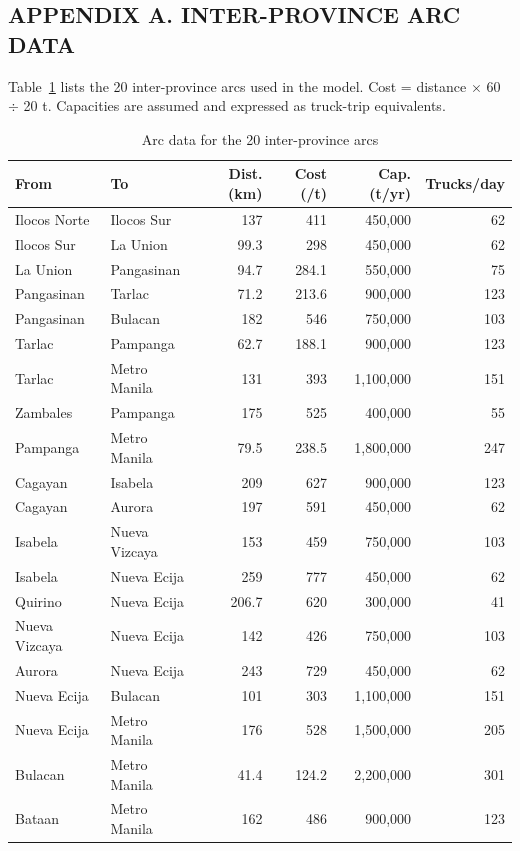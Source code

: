 \documentclass{icsthesis}
\begin{document}
\begin{mainmatter}

\doublespacing
\section{APPENDIX A. INTER-PROVINCE ARC DATA}
Table~\ref{tab:appA} lists the 20 inter-province arcs used in the model. Cost = distance $\times$ 60 $\div$ 20 t. Capacities are assumed and expressed as truck-trip equivalents.

\begin{table}[htbp]
\caption{Arc data for the 20 inter-province arcs}
\label{tab:appA}
\centering
\small
\setlength{\tabcolsep}{1.5pt}
\begin{tabular}{llrrrr}
\hline
From & To & Dist. (km) & Cost (/t) & Cap. (t/yr) & Trucks/day \\
\hline
Ilocos Norte & Ilocos Sur & 137 & 411 & 450,000 & 62 \\
Ilocos Sur & La Union & 99.3 & 298 & 450,000 & 62 \\
La Union & Pangasinan & 94.7 & 284.1 & 550,000 & 75 \\
Pangasinan & Tarlac & 71.2 & 213.6 & 900,000 & 123 \\
Pangasinan & Bulacan & 182 & 546 & 750,000 & 103 \\
Tarlac & Pampanga & 62.7 & 188.1 & 900,000 & 123 \\
Tarlac & Metro Manila & 131 & 393 & 1,100,000 & 151 \\
Zambales & Pampanga & 175 & 525 & 400,000 & 55 \\
Pampanga & Metro Manila & 79.5 & 238.5 & 1,800,000 & 247 \\
Cagayan & Isabela & 209 & 627 & 900,000 & 123 \\
Cagayan & Aurora & 197 & 591 & 450,000 & 62 \\
Isabela & Nueva Vizcaya & 153 & 459 & 750,000 & 103 \\
Isabela & Nueva Ecija & 259 & 777 & 450,000 & 62 \\
Quirino & Nueva Ecija & 206.7 & 620 & 300,000 & 41 \\
Nueva Vizcaya & Nueva Ecija & 142 & 426 & 750,000 & 103 \\
Aurora & Nueva Ecija & 243 & 729 & 450,000 & 62 \\
Nueva Ecija & Bulacan & 101 & 303 & 1,100,000 & 151 \\
Nueva Ecija & Metro Manila & 176 & 528 & 1,500,000 & 205 \\
Bulacan & Metro Manila & 41.4 & 124.2 & 2,200,000 & 301 \\
Bataan & Metro Manila & 162 & 486 & 900,000 & 123 \\
\hline
\end{tabular}
\end{table}


\end{mainmatter}
\end{document}
